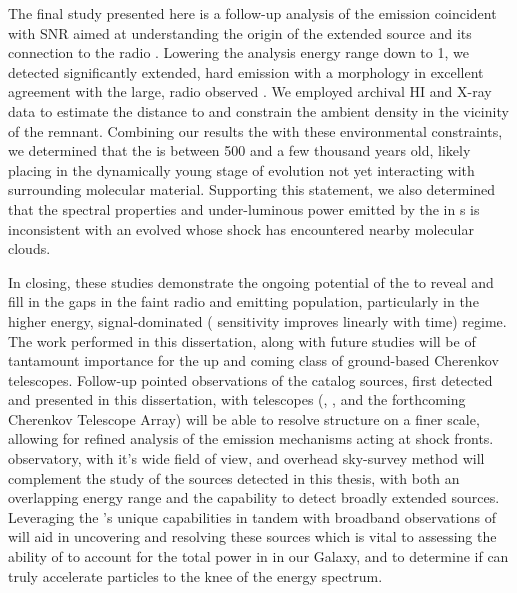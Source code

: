 The final study presented here is a follow-up analysis of the \gam{} emission coincident with SNR \Gone{} aimed at understanding the origin of the extended \gam{} source and its connection to the radio \snr{}. Lowering the analysis energy range down to 1\gev{}, we detected significantly extended,  hard \gam{} emission with a morphology in excellent agreement with the large, radio observed \snr{}. We employed archival HI and X-ray data to estimate the distance to \Gone{}  and constrain the ambient density in the vicinity of the remnant. Combining our\gev{} results the with these environmental constraints, we determined that the \snr{} is between 500  and a few thousand years old, likely placing \Gone{} in the dynamically young stage of evolution \ie{} not yet interacting with surrounding molecular material. Supporting this statement, we also determined that the spectral properties and under-luminous power emitted by the \snr{} in \gam{}s is inconsistent with an evolved \snr{} whose shock has encountered nearby molecular clouds. 

In closing, these studies demonstrate the ongoing potential of the \lat{} to reveal and fill in the gaps in the faint radio and \gam{} emitting \snr{} population, particularly in the higher energy, signal-dominated (\ie{} sensitivity improves linearly with time) regime. The work performed in this dissertation, along with future \lat{} \snr{} studies will be of tantamount importance for the up and coming class of ground-based Cherenkov telescopes. Follow-up pointed observations of the  catalog sources, first detected and presented in this dissertation, with\tev{} telescopes (\veritas{}, \hess{}, and the forthcoming Cherenkov Telescope Array) will be able to resolve structure on a finer scale, allowing for refined analysis of the \gam{} emission mechanisms acting at \snr{} shock fronts. \hawc{} observatory, with it's wide field of view, and \textit{}overhead sky-survey method will complement the study of the sources detected in this thesis, with both an overlapping energy range and the capability to detect broadly extended sources. Leveraging the \lat{}'s unique capabilities in tandem with broadband observations of \snrs{} will aid in uncovering and resolving these \gam{} sources which is vital to assessing the ability of \snrs{} to account for the total power in \crs{} in our Galaxy, and to determine if \snrs{} can truly accelerate particles to the knee of the \cray{} energy spectrum. 





